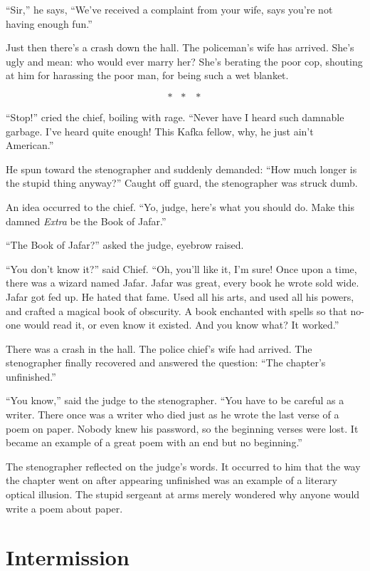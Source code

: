 \documentclass[oneside]{book}
\begin{document}
``Sir,'' he says, ``We've received a complaint from your wife, says you're not having enough fun.''

Just then there's a crash down the hall.  The policeman's wife has arrived.  She's ugly and mean: who would
ever marry her?  She's berating the poor cop, shouting at him for harassing the poor man, for being
such a wet blanket.

\[*\mbox{ }*\mbox{ }*\]

``Stop!'' cried the chief, boiling with rage.
``Never have I heard such damnable garbage.
I've heard quite enough!  This Kafka fellow, why, he just ain't American.''

He spun toward the stenographer and suddenly demanded:  ``How much longer
is the stupid thing anyway?''  Caught off guard, the stenographer was
struck dumb.

An idea occurred to the chief.
``Yo, judge, here's what you should do.  Make this damned \emph{Extra} be the Book
of Jafar.''

``The Book of Jafar?'' asked the judge, eyebrow raised.

``You don't know it?'' said Chief.  ``Oh, you'll like it, I'm sure!
Once upon a time, there was a wizard named Jafar.
Jafar was great, every book he wrote sold wide.
Jafar got fed up.  He hated that fame.  Used all his
arts, and used all his powers, and crafted a magical book of obscurity.
A book enchanted with spells so that no-one would read it, or even know
it existed.  And you know what?  It worked.''

There was a crash in the hall.  The police chief's wife had arrived.
The stenographer finally recovered and answered the question:
``The chapter's unfinished.''

\clearpage

``You know,'' said the judge to the stenographer.
``You have to be careful as a writer.
There once was a writer who died just as he wrote
the last verse of a poem on paper.  Nobody knew his password,
so the beginning verses were lost.  It became an example
of a great poem with an end but no beginning.''

The stenographer reflected on the judge's words.
It occurred to him that the way the chapter went on after
appearing unfinished was an example of a literary
optical illusion.  The stupid sergeant at arms merely
wondered why anyone would write a poem about paper.

\chapter{Intermission}
\end{document}
